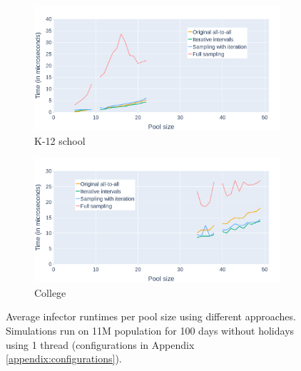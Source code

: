 \begin{figure}\ContinuedFloat
    \centering
    \begin{subfigure}{.8\linewidth}
        \centering
        \includegraphics[width=\textwidth]{4 - Sampling/fig/full_sampling/times_avg_fs_pType_k12school.png}
        \caption{K-12 school}
        \label{fig:times_avg_fs_pType_k12school}
    \end{subfigure}
    \begin{subfigure}{.8\linewidth}
        \centering
        \includegraphics[width=\textwidth]{4 - Sampling/fig/full_sampling/times_avg_fs_pType_college.png}
        \caption{College}
        \label{fig:times_avg_fs_pType_college}
    \end{subfigure}
    \caption{Average infector runtimes per pool size using different approaches. Simulations run on 11M population for 100 days without holidays using 1 thread (configurations in Appendix \ref{appendix:configurations}).}
    \label{fig:times_avg_fs_pType}
\end{figure}

